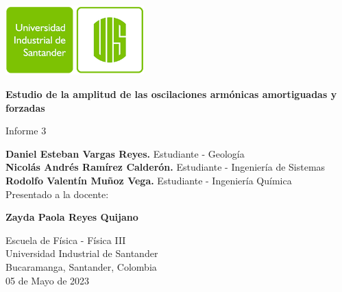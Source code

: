 \begin{titlepage}
    \begin{center}
        \includegraphics[width=0.4\textwidth]{../general-images/uis-logo.png}
        
        \vspace{0.5cm}
        \LARGE
        \textbf{Estudio de la amplitud de las oscilaciones armónicas amortiguadas y forzadas}
        
        \vspace{0.5cm}
        \large
        Informe 3
        
        \vfill
        
        \textbf{Daniel Esteban Vargas Reyes.} Estudiante - Geología\\
        \textbf{Nicolás Andrés Ramírez Calderón.} Estudiante - Ingeniería de Sistemas\\ 
        \textbf{Rodolfo Valentín Muñoz Vega.} Estudiante - Ingeniería Química\\

        \vspace{1.0cm}
        Presentado a la docente:
        
        \textbf{Zayda Paola Reyes Quijano}
        
        \vfill
        
        Escuela de Física - Física III\\
        Universidad Industrial de Santander\\
        Bucaramanga, Santander, Colombia\\
        05 de Mayo de 2023        
    \end{center}
\end{titlepage}
